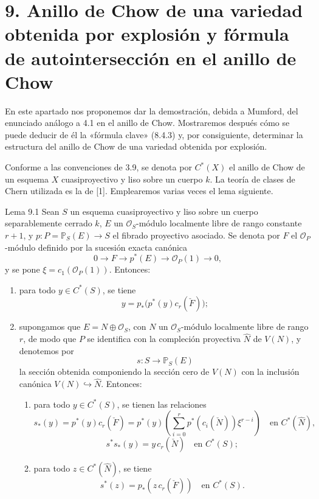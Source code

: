 \section*{9. Anillo de Chow de una variedad obtenida por explosión y fórmula de autointersección en el anillo de Chow}

En este apartado nos proponemos dar la demostración, debida a Mumford, del enunciado análogo a 4.1 en el anillo de Chow. Mostraremos después cómo se puede deducir de él la «fórmula clave» (8.4.3) y, por consiguiente, determinar la estructura del anillo de Chow de una variedad obtenida por explosión.

Conforme a las convenciones de 3.9, se denota por $C^*(X)$ el anillo de Chow de un esquema $X$ cuasiproyectivo y liso sobre un cuerpo $k$. La teoría de clases de Chern utilizada es la de [1]. Emplearemos varias veces el lema siguiente.

\begin{statement}{Lema 9.1}
Sean $S$ un esquema cuasiproyectivo y liso sobre un cuerpo separablemente cerrado $k$, $E$ un $\mathcal O_S$-módulo localmente libre de rango constante $r+1$, y $p:P=\mathbb P_S(E)\to S$ el fibrado proyectivo asociado. Se denota por $F$ el $\mathcal O_P$-módulo definido por la sucesión exacta canónica
\[
0\to F\to p^*(E)\to\mathcal O_P(1)\to0,
\tag{9.1.0}
\]
y se pone $\xi=c_1(\mathcal O_P(1))$. Entonces:
\begin{enumerate}[label=(\roman*)]
\item para todo $y\in C^*(S)$, se tiene
\[
y=p_*\bigl(p^*(y)c_r(\check F)\bigr);
\tag{9.1.1}
\]
\item supongamos que $E=N\oplus\mathcal O_S$, con $N$ un $\mathcal O_S$-módulo localmente libre de rango $r$, de modo que $P$ se identifica con la compleción proyectiva $\widehat N$ de $V(N)$, y denotemos por
\[
s:S\to\mathbb P_S(E)
\]
la sección obtenida componiendo la sección cero de $V(N)$ con la inclusión canónica $V(N)\hookrightarrow\widehat N$. Entonces:
\begin{enumerate}[label=(\alph*)]
\item para todo $y\in C^*(S)$, se tienen las relaciones
\[
s_*(y)=p^*(y)c_r(\check F)=p^*(y)\left(\sum_{i=0}^r p^*(c_i(\check N))\xi^{r-i}\right)
\quad\text{en }C^*(\widehat N),
\tag{9.1.2}
\]
\[
s^*s_*(y)=y\,c_r(\check N)\quad\text{en }C^*(S);
\tag{9.1.3}
\]
\item para todo $z\in C^*(\widehat N)$, se tiene
\[
s^*(z)=p_*(z\,c_r(\check F))\quad\text{en }C^*(S).
\tag{9.1.4}
\]
\end{enumerate}
\end{enumerate}
\end{statement}
